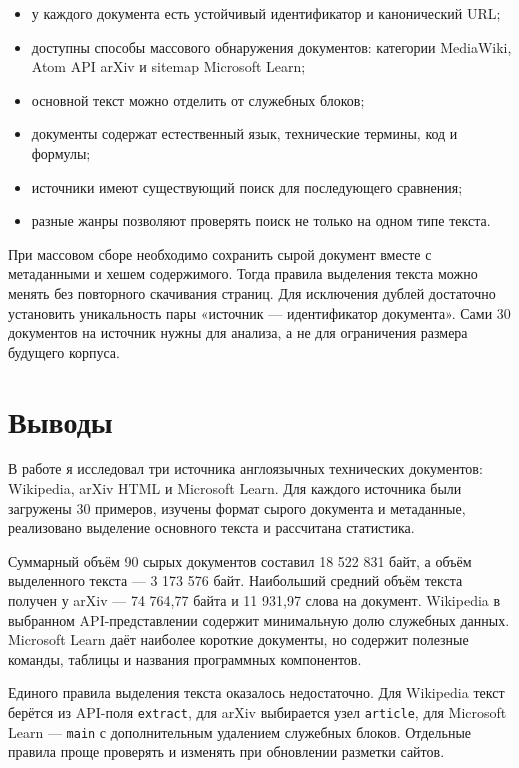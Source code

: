 \documentclass[pdf,unicode,12pt,a4paper,oneside,fleqn]{article}
\begin{document}
\begin{itemize}
    \item у каждого документа есть устойчивый идентификатор и канонический URL;
    \item доступны способы массового обнаружения документов: категории
    MediaWiki, Atom API arXiv и sitemap Microsoft Learn;
    \item основной текст можно отделить от служебных блоков;
    \item документы содержат естественный язык, технические термины, код и формулы;
    \item источники имеют существующий поиск для последующего сравнения;
    \item разные жанры позволяют проверять поиск не только на одном типе текста.
\end{itemize}

При массовом сборе необходимо сохранить сырой документ вместе с метаданными и
хешем содержимого. Тогда правила выделения текста можно менять без повторного
скачивания страниц. Для исключения дублей достаточно установить уникальность
пары «источник --- идентификатор документа». Сами 30 документов на источник
нужны для анализа, а не для ограничения размера будущего корпуса.

\section{Выводы}

В работе я исследовал три источника англоязычных технических документов:
Wikipedia, arXiv HTML и Microsoft Learn. Для каждого источника были загружены 30
примеров, изучены формат сырого документа и метаданные, реализовано выделение
основного текста и рассчитана статистика.

Суммарный объём 90 сырых документов составил 18 522 831 байт, а объём
выделенного текста --- 3 173 576 байт. Наибольший средний объём текста получен у
arXiv --- 74 764,77 байта и 11 931,97 слова на документ. Wikipedia в выбранном
API-представлении содержит минимальную долю служебных данных. Microsoft Learn
даёт наиболее короткие документы, но содержит полезные команды, таблицы и
названия программных компонентов.

Единого правила выделения текста оказалось недостаточно. Для Wikipedia текст
берётся из API-поля \texttt{extract}, для arXiv выбирается узел
\texttt{article}, для Microsoft Learn --- \texttt{main} с дополнительным
удалением служебных блоков. Отдельные правила проще проверять и изменять при
обновлении разметки сайтов.
\end{document}
